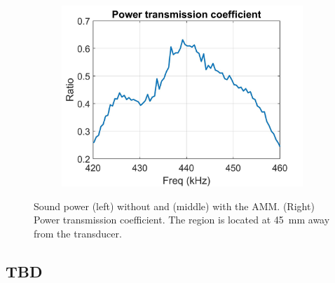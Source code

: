 \documentclass{article}
\begin{document}
\begin{figure}[!htb]
\begin{subfigure}{0.32\textwidth}
        \includegraphics[width = \textwidth]{../../matlab/exp/fig/CalPowTransCoef_230302C_PowCoefAMM.jpg}
    \end{subfigure}
    \caption{
        Sound power (left) without and (middle) with the AMM.
        (Right) Power transmission coefficient.
    The region is located at 45~mm away from the transducer.}
    \label{fig:f9j:0213921j09j}
\end{figure}




\begin{appendices}

\section{TBD}

\end{appendices}




\end{document}
